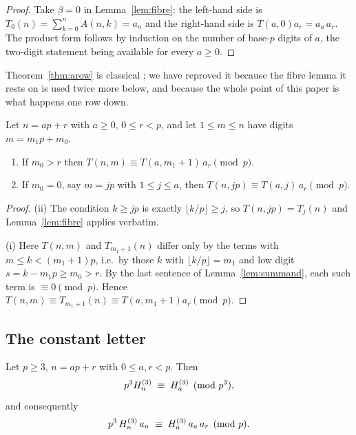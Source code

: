 \begin{proof}
Take $\beta=0$ in Lemma~\ref{lem:fibre}: the left-hand side is $T_0(n)=\sum_{k=0}^nA(n,k)=a_n$
and the right-hand side is $T(a,0)a_r=a_a\,a_r$. The product form follows by induction on
the number of base-$p$ digits of $a$, the two-digit statement being available for every
$a\ge0$.
\end{proof}

Theorem~\ref{thm:arow} is classical \cite{Gessel1982,MalikStraub,Straub2301};
we have reproved it because the fibre lemma it rests on is used twice more below, and
because the whole point of this paper is what happens one row down.

\begin{corollary}\label{cor:tailfact}
Let $n=ap+r$ with $a\ge0$, $0\le r<p$, and let $1\le m\le n$ have digits $m=m_1p+m_0$.
\begin{enumerate}[label=\textup{(\roman*)}]
\item If $m_0>r$ then $T(n,m)\equiv T(a,m_1+1)\,a_r\pmod p$.
\item If $m_0=0$, say $m=jp$ with $1\le j\le a$, then $T(n,jp)\equiv T(a,j)\,a_r\pmod p$.
\end{enumerate}
\end{corollary}

\begin{proof}
(ii) The condition $k\ge jp$ is exactly $\lfloor k/p\rfloor\ge j$, so $T(n,jp)=T_j(n)$ and
Lemma~\ref{lem:fibre} applies verbatim.

(i) Here $T(n,m)$ and $T_{m_1+1}(n)$ differ only by the terms with $m\le k<(m_1+1)p$,
i.e.\ by those $k$ with $\lfloor k/p\rfloor=m_1$ and low digit $s=k-m_1p\ge m_0>r$. By the
last sentence of Lemma~\ref{lem:summand}, each such term is $\equiv0\pmod p$. Hence
$T(n,m)\equiv T_{m_1+1}(n)\equiv T(a,m_1+1)a_r\pmod p$.
\end{proof}

\subsection{The constant letter}

\begin{lemma}[$H$-part]\label{lem:Hpart}
Let $p\ge3$, $n=ap+r$ with $0\le a,r<p$. Then
\[
   p^3H^{(3)}_{n}\;\equiv\;H^{(3)}_{a} \pmod{p^3},
\]
and consequently
\begin{equation}\label{eq:Hpart}
   p^3\,H^{(3)}_{n}\,a_n\;\equiv\;H^{(3)}_{a}\,a_a\,a_r\pmod p .
\end{equation}
\end{lemma}

